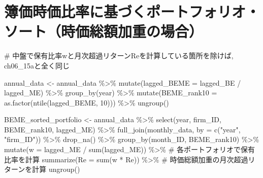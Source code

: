 \documentclass[
  letterpaper,
  DIV=11,
  numbers=noendperiod]{scrreprt}
\newenvironment{Shaded}{\begin{snugshade}}{\end{snugshade}}
\newcommand{\AttributeTok}[1]{\textcolor[rgb]{0.40,0.45,0.13}{#1}}
\newcommand{\CommentTok}[1]{\textcolor[rgb]{0.37,0.37,0.37}{#1}}
\newcommand{\DecValTok}[1]{\textcolor[rgb]{0.68,0.00,0.00}{#1}}
\newcommand{\FunctionTok}[1]{\textcolor[rgb]{0.28,0.35,0.67}{#1}}
\newcommand{\NormalTok}[1]{\textcolor[rgb]{0.00,0.23,0.31}{#1}}
\newcommand{\OtherTok}[1]{\textcolor[rgb]{0.00,0.23,0.31}{#1}}
\newcommand{\SpecialCharTok}[1]{\textcolor[rgb]{0.37,0.37,0.37}{#1}}
\newcommand{\StringTok}[1]{\textcolor[rgb]{0.13,0.47,0.30}{#1}}
\begin{document}
\section{簿価時価比率に基づくポートフォリオ・ソート（時価総額加重の場合）}\label{ux7c3fux4fa1ux6642ux4fa1ux6bd4ux7387ux306bux57faux3065ux304fux30ddux30fcux30c8ux30d5ux30a9ux30eaux30aaux30bdux30fcux30c8ux6642ux4fa1ux7dcfux984dux52a0ux91cdux306eux5834ux5408}

\begin{Shaded}
\begin{Highlighting}[]
\CommentTok{\# 中盤で保有比率wと月次超過リターンReを計算している箇所を除けば, ch06\_15aと全く同じ}

\NormalTok{annual\_data }\OtherTok{\textless{}{-}}\NormalTok{ annual\_data }\SpecialCharTok{\%\textgreater{}\%} 
  \FunctionTok{mutate}\NormalTok{(}\AttributeTok{lagged\_BEME =}\NormalTok{ lagged\_BE }\SpecialCharTok{/}\NormalTok{ lagged\_ME) }\SpecialCharTok{\%\textgreater{}\%} 
  \FunctionTok{group\_by}\NormalTok{(year) }\SpecialCharTok{\%\textgreater{}\%} 
  \FunctionTok{mutate}\NormalTok{(}\AttributeTok{BEME\_rank10 =} \FunctionTok{as.factor}\NormalTok{(}\FunctionTok{ntile}\NormalTok{(lagged\_BEME, }\DecValTok{10}\NormalTok{))) }\SpecialCharTok{\%\textgreater{}\%} 
  \FunctionTok{ungroup}\NormalTok{()}
  
\NormalTok{BEME\_sorted\_portfolio }\OtherTok{\textless{}{-}}\NormalTok{ annual\_data }\SpecialCharTok{\%\textgreater{}\%}
  \FunctionTok{select}\NormalTok{(year, firm\_ID, BEME\_rank10, lagged\_ME) }\SpecialCharTok{\%\textgreater{}\%}
  \FunctionTok{full\_join}\NormalTok{(monthly\_data, }\AttributeTok{by =} \FunctionTok{c}\NormalTok{(}\StringTok{"year"}\NormalTok{, }\StringTok{"firm\_ID"}\NormalTok{)) }\SpecialCharTok{\%\textgreater{}\%}
  \FunctionTok{drop\_na}\NormalTok{() }\SpecialCharTok{\%\textgreater{}\%} 
  \FunctionTok{group\_by}\NormalTok{(month\_ID, BEME\_rank10) }\SpecialCharTok{\%\textgreater{}\%}
  \FunctionTok{mutate}\NormalTok{(}\AttributeTok{w =}\NormalTok{ lagged\_ME }\SpecialCharTok{/} \FunctionTok{sum}\NormalTok{(lagged\_ME)) }\SpecialCharTok{\%\textgreater{}\%} \CommentTok{\# 各ポートフォリオで保有比率を計算}
  \FunctionTok{summarize}\NormalTok{(}\AttributeTok{Re =} \FunctionTok{sum}\NormalTok{(w }\SpecialCharTok{*}\NormalTok{ Re)) }\SpecialCharTok{\%\textgreater{}\%} \CommentTok{\# 時価総額加重の月次超過リターンを計算}
  \FunctionTok{ungroup}\NormalTok{() }


\end{Highlighting}
\end{Shaded}
\end{document}
